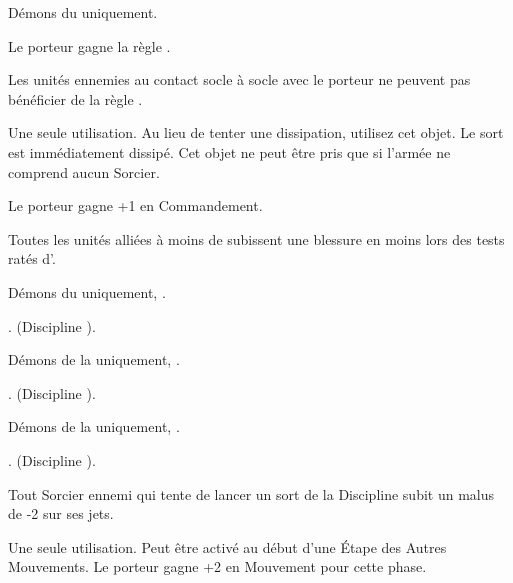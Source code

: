 \newpage
\begin{multicols}{2}\raggedcolumns

\subtitle{Objets enchantés démoniaques}\vspace{5pt}

\startpricelist

Démons du \textbf{\dchange} uniquement.

Le porteur gagne la règle .

Les unités ennemies au contact socle à socle avec le porteur ne peuvent pas bénéficier de la règle \holdyourground{}.

Une seule utilisation. Au lieu de tenter une dissipation, utilisez cet objet. Le sort est immédiatement dissipé. Cet objet ne peut être pris que si l'armée ne comprend aucun Sorcier.

Le porteur gagne +1 en Commandement.

Toutes les unités alliées à moins de  subissent une blessure en moins lors des tests ratés d'\daemonicinstability{}.

Démons du \textbf{\dchange} uniquement, \oneofakind{}.

. \changespelltwo{} (Discipline \change{}).

Démons de la \textbf{\dlust} uniquement, \oneofakind{}.

. \lustspellthree{} (Discipline \lust{}).

Démons de la \textbf{\pestilence} uniquement, \oneofakind{}.

. \diseasespelltwo{} (Discipline \disease{}).

Tout Sorcier ennemi qui tente de lancer un sort de la Discipline \light{} subit un malus de -2 sur ses jets.

Une seule utilisation. Peut être activé au début d'une Étape des Autres Mouvements. Le porteur gagne +2 en Mouvement pour cette phase.

\endpricelist

\subtitle{Objets cabalistiques démoniaques}\vspace{5pt}

\startpricelist


\end{multicols}
